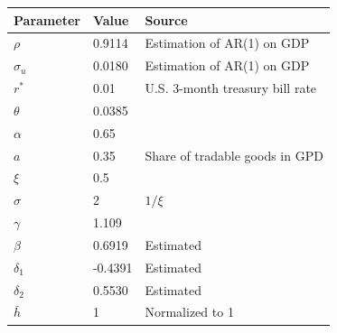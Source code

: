 \documentclass[mathserif]{beamer}
\begin{document}
    \begin{frame}
        \centering
        \begin{tabular}{@{}lll@{}}
        \toprule
        Parameter  & Value  & Source                                                                         \\ 
        \midrule
        $\rho$     & 0.9114  & Estimation of AR(1) on GDP\\
        $\sigma_u$ & 0.0180 & Estimation of AR(1) on GDP \\
        $r^*$      & 0.01 & U.S. 3-month treasury bill rate \\
        $\theta$   & 0.0385 & \citet*{Chatterjee-12}                                              \\
        $\alpha$   & 0.65   & \citet{Jegajeevan-Sri-Lanka-DSGE}                                                       \\
        $a$        & 0.35   & Share of tradable goods in GPD                  \\
        $\xi$      & 0.5   & \citet{Na-18}                             \\
        $\sigma$   & 2   & $1 / \xi$                                                                      \\
        $\gamma$   & 1.109   & \citet*{wage-rigidity-data}                  \\
        $\beta$    & 0.6919  &  Estimated                                                                              \\
        $\delta_1$ &  -0.4391 &   Estimated                                                                             \\
        $\delta_2$ &  0.5530   &               Estimated                                                                 \\
        $\bar{h}$  & 1      & Normalized to 1\\
        \bottomrule
        \end{tabular}%

    \end{frame}
\end{document}
